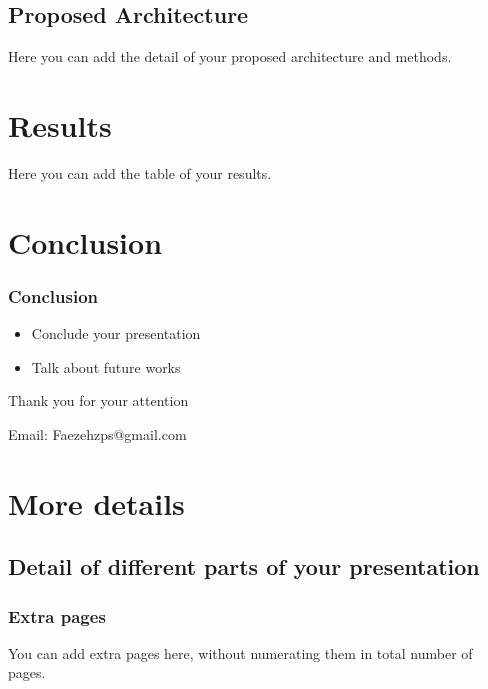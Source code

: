 \documentclass[]{beamer}
\newcommand{\backupbegin}{
   \newcounter{finalframe}
   \setcounter{finalframe}{\value{framenumber}}
}
\newcommand{\backupend}{
   \setcounter{framenumber}{\value{finalframe}}
}
\begin{document}
\subsection{Proposed Architecture}

\begin{frame}
Here you can add the detail of your proposed architecture and methods.
\end{frame}

\section{Results}

\begin{frame}
Here you can add the table of your results.
\end{frame}

 
\section{Conclusion}
\begin{frame}
\frametitle{Conclusion}

\begin{itemize}
\item Conclude your presentation
\item Talk about future works
\end{itemize}
\end{frame}

\begin{frame}

\bigskip
\bigskip
\bigskip
\bigskip

\centering
Thank you for your attention

\bigskip
\bigskip
\bigskip
\bigskip
\bigskip

\centering
\tiny{Email: Faezehzps@gmail.com} 
\end{frame}


\appendix

\backupbegin
\section{More details}

\subsection{Detail of different parts of your presentation}
\begin{frame}
\frametitle{Extra pages}
You can add extra pages here, without numerating them in total number of pages.
\end{frame}

\backupend
\end{document}
